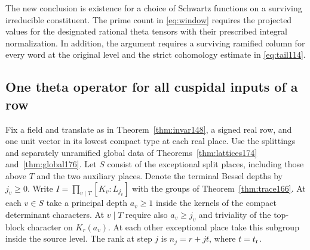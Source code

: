 \documentclass[a4paper,11pt]{article}
\theoremstyle{definition}
\theoremstyle{remark}
\numberwithin{equation}{section}
\begin{document}
The new conclusion is existence for a choice of Schwartz
functions on a surviving irreducible constituent. The prime
count in \eqref{eq:window} requires the projected values for
the designated rational theta tensors with their prescribed
integral normalization. In addition, the argument requires
a surviving ramified column for every word at the original
level and the strict cohomology estimate in \eqref{eq:tail114}.

\subsection{One theta operator for all cuspidal inputs of a row}\label{nav:VIII-22}
Fix a field and translate as in Theorem~\ref{thm:invar148},
a signed real row, and one unit vector in its lowest compact
type at each real place. Use the splittings and separately
unramified global data of Theorems~\ref{thm:lattices174}
and~\ref{thm:global176}. Let \(S\) consist of the exceptional
split places, including those above \(T\) and the two auxiliary
places. Denote the terminal Bessel depths by \(j_v\ge0\).
Write \(I=\prod_{v\mid T}[K_v:L_{j_v}]\) with the groups of
Theorem~\ref{thm:trace166}. At each \(v\in S\) take a principal
depth \(a_v\ge1\) inside the kernels of the compact determinant
characters. At \(v\mid T\) require also \(a_v\ge j_v\) and
triviality of the top-block character on \(K_r(a_v)\).
At each other exceptional place take this subgroup inside
the source level. The rank at step \(j\) is \(n_j=r+jt\),
where \(t=t_{\rm r}\).
\end{document}
